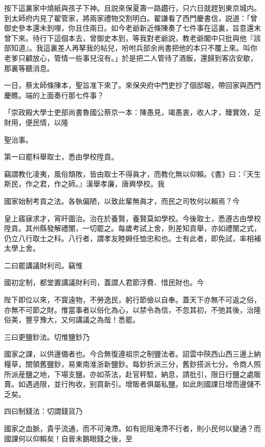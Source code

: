 按下這裏家中燒紙與孩子下神。且説來保夏壽一路趲行，只六日就趕到東京城内。到太師府内見了翟管家，將兩家禮物交割明白。翟謙看了西門慶書信，説道：「曾御史參本還未到哩，你且住兩日。如今老爺新近條陳奏了七件事在這裏，旨意還末曾下來。待行下這個本去，曾御史本到，等我對老爺説，教老爺閣中只批與他『該部知道』。我這裏差人再拏我的帖兒，吩咐兵部余尚書把他的本只不覆上來。叫你老爹只顧放心，管情一些事兒沒有。」於是把二人管待了酒飯，還歸到客店安歇，那裏等聽消息。

一日，蔡太師條陳本，聖旨准下來了。來保央府中門吏抄了個邸報，帶回家與西門慶瞧。端的上面奏行那七件事？

\begin{myquote}[\markfont]
「崇政殿大學士吏部尚書魯國公蔡京一本：陳愚見，竭愚衷，收人才，臻實效，足財用，便民情，以隆

聖治事。

\hspace*{2em}第一曰罷科舉取士，悉由學校陞貢。

竊謂教化凌夷，風俗頽敗，皆由取士不得眞才，而教化無以仰賴。《書》曰：『天生斯民，作之君，作之師。』漢舉孝廉，唐興學校。我

國家始制考貢之法。各執偏陋，以致此輩無眞才，而民之司牧何以賴焉？今

皇上寤寐求才，宵旰圖治。治在於養賢，養賢莫如學校。今後取士，悉遵古由學校陞貢。其州縣發解禮闈，一切罷之。每歲考試上舍，則差知貢舉，亦如禮闈之式，仍立八行取士之科。八行者，謂孝友睦婣任恤忠和也。士有此者，即免試，率相補太學上舍。

\hspace*{2em}二曰罷講議財利司。竊惟

國初定制，都堂置講議財利司，蓋謂人君節浮費、惜民財也。今

陛下即位以來，不寳遠物，不勞逸民，躬行節儉以自奉。蓋天下亦無不可返之俗，亦無不可節之財。惟當事者以俗化為心，以禁令為信，不忽其初，不弛其後，治隆俗美，豐亨豫大，又何講議之為哉！悉罷。

\hspace*{2em}三曰更鹽鈔法。切惟鹽鈔乃

國家之課，以供邊備者也。今合無復遵祖宗之制鹽法者。詔雲中陝西山西三邊上納糧草，關領舊鹽鈔，易東南淮浙新鹽鈔。每鈔折派三分，舊鈔搭派七分。令商人照所派産鹽之地，下場支鹽。亦如茶法，赴官秤騐，納息，請批引，限日行鹽之處販賣。如遇過限，並行拘收，别買新引。增販者俱屬私鹽。如此則國課日增而邊儲不乏矣。

\hspace*{2em}四曰制錢法：切謂錢貨乃

國家之血脈，貴乎流通，而不可淹滯。如有扼阻淹滯不行者，則小民何以變通？而國課何以仰賴矣！自晉末鵝眼錢之後，至


\end{myquote}
